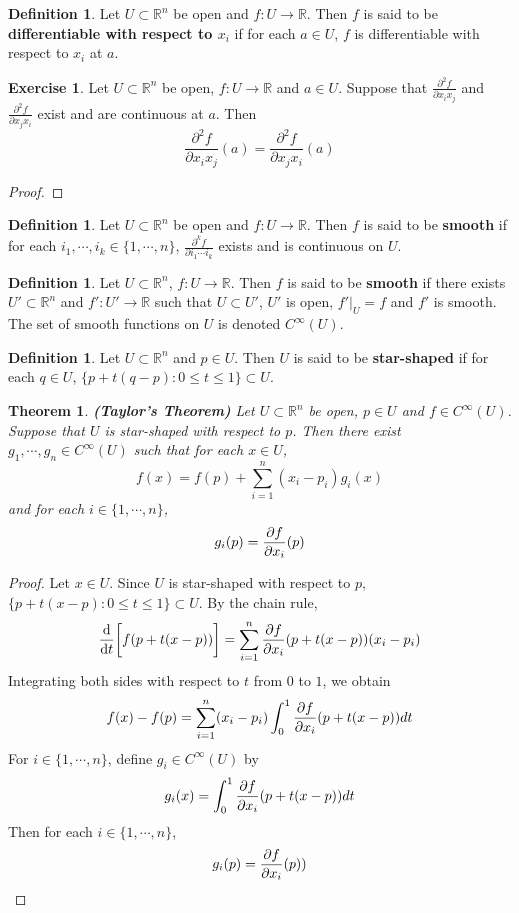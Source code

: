 \documentclass[12pt]{amsart}
\newtheorem{thm}{Theorem}[subsection]
\theoremstyle{definition}
\newtheorem{defn}[definition]{Definition}
\theoremstyle{definition}
\newtheorem{ex}[definition]{Exercise}
\newcommand{\R}{\mathbb{R}}
\begin{document}
	\begin{defn}
		Let $U \subset \R^n$ be open and $f: U \rightarrow \R$. Then $f$ is said to be \textbf{differentiable with respect to $x_i$} if for each $a \in U$, $f$ is differentiable with respect to $x_i$ at $a$.
	\end{defn}

	\begin{ex}
		Let $U \subset \R^n$ be open, $f: U \rightarrow \R$ and $a \in U$. Suppose that $\frac{\partial ^2 f}{\partial x_i x_j}$ and $\frac{\partial ^2 f}{\partial x_j x_i}$ exist and are continuous at $a$. Then $$\frac{\partial ^2 f}{\partial x_i x_j} (a) = \frac{\partial ^2 f}{\partial x_j x_i} (a)$$
	\end{ex}

	\begin{proof}
		
	\end{proof}

	\begin{defn}
		Let $U \subset \R^n$ be open and $f: U \rightarrow \R$. Then $f$ is said to be \textbf{smooth} if for each $i_1, \cdots, i_k \in \{1, \cdots, n\}$, $\frac{\partial^k f}{\partial i_1 \cdots i_k}$ exists and is continuous on $U$.
	\end{defn}

	\begin{defn}
		Let $U \subset \R^n$, $f: U \rightarrow \R$. Then $f$ is said to be \textbf{smooth} if there exists $U' 
		\subset \R^n$ and $f':U' \rightarrow \R$ such that $U \subset U'$, $U'$ is open, $f'|_U = f$ and $f'$ is smooth. The set of smooth functions on $U$ is denoted $C^{\infty}(U)$.
	\end{defn}

	\begin{defn} 
		Let $U \subset \R^n$ and $p \in U$. Then $U$ is said to be \textbf{star-shaped} if for each $q \in U$, $\{p + t(q-p): 0 \leq t \leq 1\} \subset U$.
	\end{defn}

	\begin{thm} \textbf{(Taylor's Theorem)}
		Let $U \subset \R^n$ be open, $p \in U$ and $f \in C^{\infty}(U)$. Suppose that $U$ is star-shaped with respect to $p$. Then there exist $g_1, \cdots, g_n \in C^{\infty}(U)$ such that for each $x \in U$, $$f(x) = f(p) + \sum_{i=1}^n (x_i - p_i) g_i(x)$$ and for each $i \in \{1, \cdots, n\}$, $$g_i(p) = {\pdv{f}{x_i}}(p)$$
	\end{thm}

	\begin{proof}
		Let $x \in U$. Since $U$ is star-shaped with respect to $p$, $\{p + t(x-p): 0 \leq t \leq 1\} \subset U$. By the chain rule, 
		$${\dv{t}} \bigg[ f(p+t(x-p)) \bigg] = \sum_{i=1}^n {\pdv{f}{x_i}}(p+t(x-p)) (x_i - p_i)$$
		Integrating both sides with respect to $t$ from $0$ to $1$, we obtain
		$$f(x) - f(p) = \sum_{i=1}^n (x_i - p_i) \int_{0}^{1}  {\pdv{f}{x_i}}(p+t(x-p)) dt $$
		For $i \in \{1, \cdots, n\}$, define $g_i \in C^{\infty}(U)$ by $$g_i(x) = \int_{0}^{1}  {\pdv{f}{x_i}}(p+t(x-p)) dt$$
		Then for each $i \in \{1, \cdots, n\}$, $$g_i(p) = {\pdv{f}{x_i}}(p))$$
	\end{proof}
\end{document}
